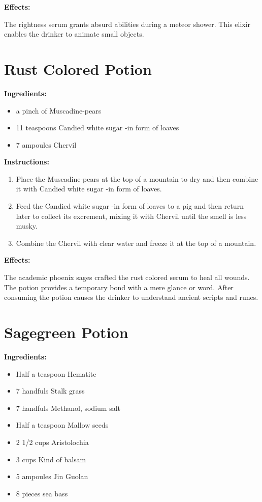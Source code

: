 \documentclass{article}
\begin{document}
\textbf{Effects:}

The rightness serum grants absurd abilities during a meteor shower. This elixir enables the drinker to animate small objects.

\newpage
\section*{Rust Colored Potion}

\textbf{Ingredients:}

\begin{itemize}
  \item a pinch of Muscadine-pears
  \item 11 teaspoons Candied white sugar -in form of loaves
  \item 7 ampoules Chervil
\end{itemize}

\textbf{Instructions:}

\begin{enumerate}
  \item Place the Muscadine-pears at the top of a mountain to dry and then combine it with Candied white sugar -in form of loaves.
  \item Feed the Candied white sugar -in form of loaves to a pig and then return later to collect its excrement, mixing it with Chervil until the smell is less musky.
  \item Combine the Chervil with clear water and freeze it at the top of a mountain.
\end{enumerate}

\textbf{Effects:}

The academic phoenix sages crafted the rust colored serum to heal all wounds. The potion provides a temporary bond with a mere glance or word. After consuming the potion causes the drinker to understand ancient scripts and runes.

\newpage
\section*{Sagegreen Potion}

\textbf{Ingredients:}

\begin{itemize}
  \item Half a teaspoon Hematite
  \item 7 handfuls Stalk grass
  \item 7 handfuls Methanol, sodium salt
  \item Half a teaspoon Mallow seeds
  \item 2 1/2 cups Aristolochia
  \item 3 cups Kind of balsam
  \item 5 ampoules Jin Guolan
  \item 8 pieces sea ​​bass
\end{itemize}
\end{document}
